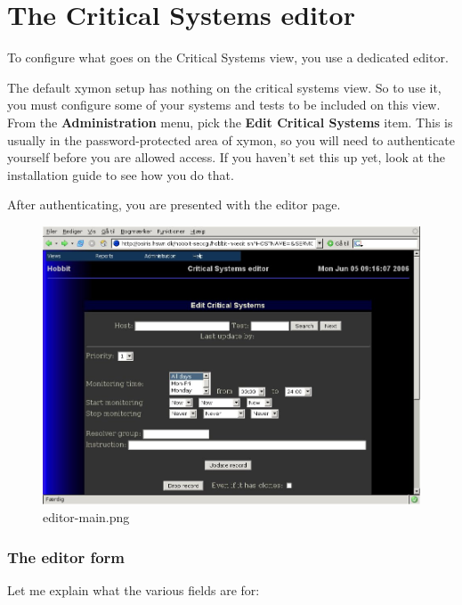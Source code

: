 \section{The Critical Systems editor}


 To configure what goes on the Critical Systems view, you use a
 dedicated editor.



 The default xymon setup has nothing on the critical systems view. So
 to use it, you must configure some of your systems and tests to be
 included on this view. From the \textbf{Administration} menu, pick
 the \textbf{Edit Critical Systems} item. This is usually in the
 password-protected area of xymon, so you will need to authenticate
 yourself before you are allowed access. If you haven't set this up
 yet, look at the installation guide to see how you do that.



 After authenticating, you are presented with the editor page. 
\begin{figure}
\centering 
\caption{editor-main.png}
\label{editor-main.png}
\includegraphics[scale=0.5]{./editor-main.png} 
\end{figure}

\subsubsection{The editor form} Let me explain what the various fields
are for: 

